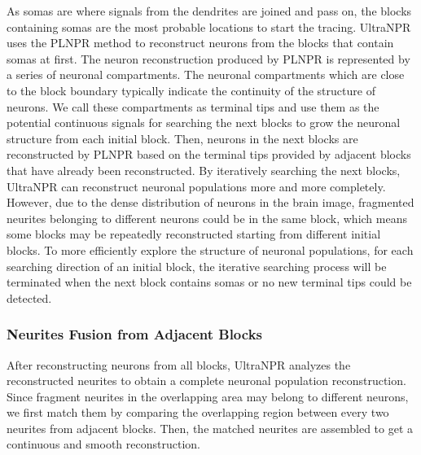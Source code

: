 {As somas are where signals from the dendrites are joined and pass on, the blocks containing somas are the most probable locations to start the tracing.
UltraNPR uses the PLNPR method to reconstruct neurons from the blocks that contain somas at first.
The neuron reconstruction produced by PLNPR is represented by a series of neuronal compartments. The neuronal compartments which are close to the block boundary typically indicate the continuity of the structure of neurons. We call these compartments as terminal tips and use them as the potential continuous signals for searching the next blocks to grow the neuronal structure from each initial block.
Then, neurons in the next blocks are reconstructed by PLNPR based on the terminal tips provided by adjacent blocks that have already been reconstructed.
By iteratively searching the next blocks, UltraNPR can reconstruct neuronal populations more and more completely.
%
However, due to the dense distribution of neurons in the brain image, fragmented neurites belonging to different neurons could be in the same block, which means some blocks may be repeatedly reconstructed starting from different initial blocks.
To more efficiently explore the structure of neuronal populations, for each searching direction of an initial block, the iterative searching process will be terminated when the next block contains somas or no new terminal tips could be detected.



\subsubsection{Neurites Fusion from Adjacent Blocks}
After reconstructing neurons from all blocks, UltraNPR analyzes the reconstructed neurites to obtain a complete neuronal population reconstruction.
%
Since fragment neurites in the overlapping area may belong to different neurons, we first match them by comparing the overlapping region between every two neurites from adjacent blocks.
Then, the matched neurites are assembled to get a continuous and smooth reconstruction. 


}
